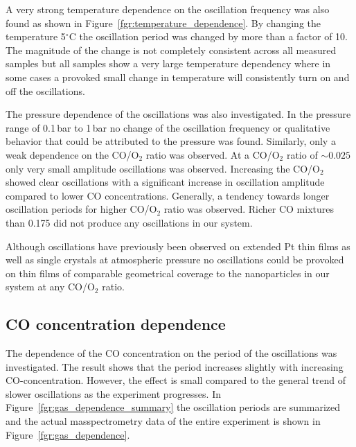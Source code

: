 \documentclass[journal=jacsat,manuscript=article]{achemso}
\begin{document}
A very strong temperature dependence on the oscillation frequency was also found as shown in Figure~\ref{fgr:temperature_dependence}. By changing the temperature 5$^\circ$C the oscillation period was changed by more than a factor of 10. The magnitude of the change is not completely consistent across all measured samples but all samples show a very large temperature dependency where in some cases a provoked small change in temperature will consistently turn on and off the oscillations.

The pressure dependence of the oscillations was also investigated. In the pressure range of 0.1\,bar to 1\,bar no change of the oscillation frequency or qualitative behavior that could be attributed to the pressure was found. Similarly, only a weak dependence on the CO/O$_2$ ratio was observed. At a CO/O$_2$ ratio of $\sim0.025$ only very small amplitude oscillations was observed. Increasing the CO/O$_2$ showed clear oscillations with a significant increase in oscillation amplitude compared to lower CO concentrations. Generally, a tendency towards longer oscillation periods for higher CO/O$_2$ ratio was observed. Richer CO mixtures than 0.175 did not produce any oscillations in our system.

Although oscillations have previously been observed on extended Pt thin films \cite{Singh2010} as well as single crystals\cite{Hendriksen2005} at atmospheric pressure no oscillations could be provoked on thin films of comparable geometrical coverage to the nanoparticles in our system at any CO/O$_2$ ratio.  


\subsection{CO concentration dependence}
The dependence of the CO concentration on the period of the oscillations was investigated. The result shows that the period increases slightly with increasing CO-concentration. However, the effect is small compared to the general trend of slower oscillations as the experiment progresses. In Figure~\ref{fgr:gas_dependence_summary} the oscillation periods are summarized and the actual masspectrometry data of the entire experiment is shown in Figure~\ref{fgr:gas_dependence}.
\end{document}
